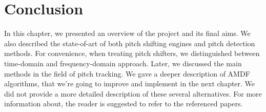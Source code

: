 \section{Conclusion}
\label{conclusion1}
In this chapter, we presented an overview of the project and its final aims. We also described the state-of-art of both pitch shifting engines and pitch detection methods. For convenience, when treating pitch shifters, we distinguished between time-domain and frequency-domain approach. Later, we discussed the main methods in the field of pitch tracking. We gave a deeper description of AMDF algorithms, that we're going to improve and implement in the next chapter. We did not provide a more detailed description of these several alternatives. For more information about, the reader is suggested to refer to the referenced papers.







